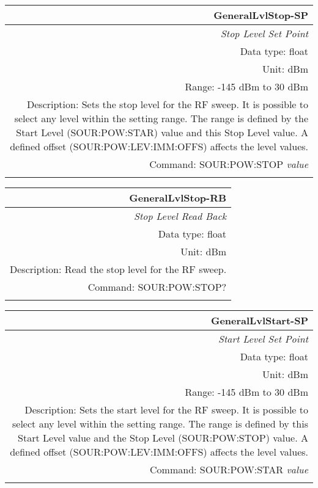 \documentclass[openany]{article}
\begin{document}
		\begin{tabular}{N}
			\hline
			\bfseries GeneralLvlStop-SP \\ \hline
			\emph{Stop Level Set Point} \\
			Data type: float \\
			Unit: dBm \\
			Range: -145 dBm to 30 dBm \\
			Description: Sets the stop level for the RF sweep. It is possible to select any level within the setting range. The range is defined by the Start Level (SOUR:POW:STAR) value and this Stop Level value. A defined offset (SOUR:POW:LEV:IMM:OFFS) affects the level values. \\
			Command: SOUR:POW:STOP \emph{value} \\
			\\

		\end{tabular}


		\begin{tabular}{N}
			\hline
			\bfseries GeneralLvlStop-RB \\ \hline
			\emph{Stop Level Read Back} \\
			Data type: float \\
			Unit: dBm \\
			Description: Read the stop level for the RF sweep. \\
			Command: SOUR:POW:STOP? \\
			\\
			
		\end{tabular}


		\begin{tabular}{N}
			\hline
			\bfseries GeneralLvlStart-SP \\ \hline
			\emph{Start Level Set Point} \\
			Data type: float \\
			Unit: dBm \\
			Range: -145 dBm to 30 dBm \\
			Description: Sets the start level for the RF sweep. It is possible to select any level within the setting range. The range is defined by this Start Level value and the Stop Level (SOUR:POW:STOP) value. A defined offset (SOUR:POW:LEV:IMM:OFFS) affects the level values. \\
			Command: SOUR:POW:STAR \emph{value} \\
			\\

		\end{tabular}
\end{document}
